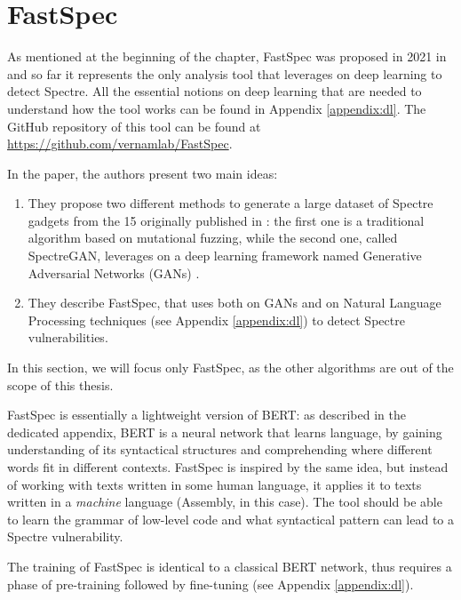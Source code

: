\documentclass[12pt,a4paper]{book}
\theoremstyle{definition}
\begin{document}
	\section{FastSpec}\label{sec:fastspec}
	As mentioned at the beginning of the chapter, FastSpec was proposed in 2021 in \cite{Tol2021} and so far it represents the only analysis tool that leverages on deep learning to detect Spectre. All the essential notions on deep learning that are needed to understand how the tool works can be found in Appendix \ref{appendix:dl}. The GitHub repository of this tool can be found at \url{https://github.com/vernamlab/FastSpec}. 
	
	In the paper, the authors present two main ideas: 
	\begin{enumerate}
		\item They propose two different methods to generate a large dataset of Spectre gadgets from the 15 originally published in \cite{Kocher2018}: the first one is a traditional algorithm based on mutational fuzzing, while the second one, called SpectreGAN, leverages on a deep learning framework named Generative Adversarial Networks (GANs) \cite{Goodfellow2014}.
		\item They describe FastSpec, that uses both on GANs and on Natural Language Processing techniques (see Appendix \ref{appendix:dl}) to detect Spectre vulnerabilities.
	\end{enumerate}
	
	In this section, we will focus only FastSpec, as the other algorithms are out of the scope of this thesis.
	
	FastSpec is essentially a lightweight version of BERT: as described in the dedicated appendix, BERT is a neural network that learns language, by gaining understanding of its syntactical structures and comprehending where different words fit in different contexts. FastSpec is inspired by the same idea, but instead of working with texts written in some human language, it applies it to texts written in a \textit{machine} language (Assembly, in this case). The tool should be able to learn the grammar of low-level code and what syntactical pattern can lead to a Spectre vulnerability.
	
	The training of FastSpec is identical to a classical BERT network, thus requires a phase of pre-training followed by fine-tuning (see Appendix \ref{appendix:dl}).
	
\end{document}
